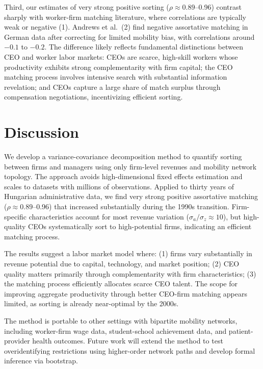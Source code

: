 \documentclass[9pt,twocolumn,twoside]{pnas-new}
\begin{document}
Third, our estimates of very strong positive sorting ($\rho \approx 0.89$--0.96) contrast sharply with worker-firm matching literature, where correlations are typically weak or negative (1). Andrews et al.\ (2) find negative assortative matching in German data after correcting for limited mobility bias, with correlations around $-0.1$ to $-0.2$. The difference likely reflects fundamental distinctions between CEO and worker labor markets: CEOs are scarce, high-skill workers whose productivity exhibits strong complementarity with firm capital; the CEO matching process involves intensive search with substantial information revelation; and CEOs capture a large share of match surplus through compensation negotiations, incentivizing efficient sorting.

\section*{Discussion}

We develop a variance-covariance decomposition method to quantify sorting between firms and managers using only firm-level revenues and mobility network topology. The approach avoids high-dimensional fixed effects estimation and scales to datasets with millions of observations. Applied to thirty years of Hungarian administrative data, we find very strong positive assortative matching ($\rho \approx 0.89$--0.96) that increased substantially during the 1990s transition. Firm-specific characteristics account for most revenue variation ($\sigma_a/\sigma_z \approx 10$), but high-quality CEOs systematically sort to high-potential firms, indicating an efficient matching process.

The results suggest a labor market model where: (1) firms vary substantially in revenue potential due to capital, technology, and market position; (2) CEO quality matters primarily through complementarity with firm characteristics; (3) the matching process efficiently allocates scarce CEO talent. The scope for improving aggregate productivity through better CEO-firm matching appears limited, as sorting is already near-optimal by the 2000s.

The method is portable to other settings with bipartite mobility networks, including worker-firm wage data, student-school achievement data, and patient-provider health outcomes. Future work will extend the method to test overidentifying restrictions using higher-order network paths and develop formal inference via bootstrap.
\end{document}
